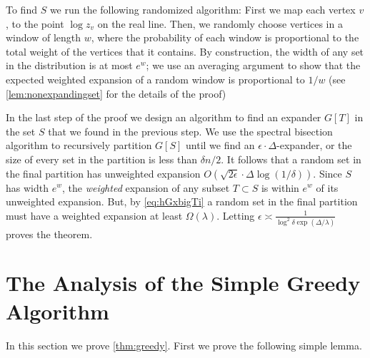 \documentclass[11pt]{article}
\def\eps{\epsilon}
\begin{document}
To find  $S$ we run the following randomized algorithm: First we map each vertex $v$, to the point $\log z_v$ on the real line. Then, we randomly choose vertices in a window of length $w$, where the probability of each window is proportional to the total weight of the vertices that it contains.  By construction, the width of any set in the distribution is at most $e^w$; we use an averaging argument to show that the expected weighted expansion of a random window is proportional to $1/w$ (see \autoref{lem:nonexpandingset} for the details of the proof)

In the last step of the proof we design an algorithm to find an expander $G[T]$ in the set $S$ that we found in the previous step. We use the spectral bisection algorithm to recursively partition $G[S]$ until we find an $\eps\cdot \Delta$-expander, or  the size of every set in the partition is less than $\delta n/2$. It follows that a random set in the final partition has  unweighted expansion $O(\sqrt{2\eps}\cdot  \Delta \log(1/\delta))$. Since $S$ has width $e^w$, the \emph{weighted} expansion of any subset $T\subset S$ is within $e^w$ of its unweighted expansion. 
But, by  \eqref{eq:hGxbigTi} a random set in the final partition must have a weighted expansion at least $\Omega(\lambda)$. 
Letting $\eps\asymp \frac{1}{\log^2\delta \exp(\Delta/\lambda)}$ proves the theorem.
\section{The Analysis of the Simple Greedy Algorithm} 
\label{sec:greedy}
In this section we prove \autoref{thm:greedy}.
First we prove the following simple lemma.
\end{document}
